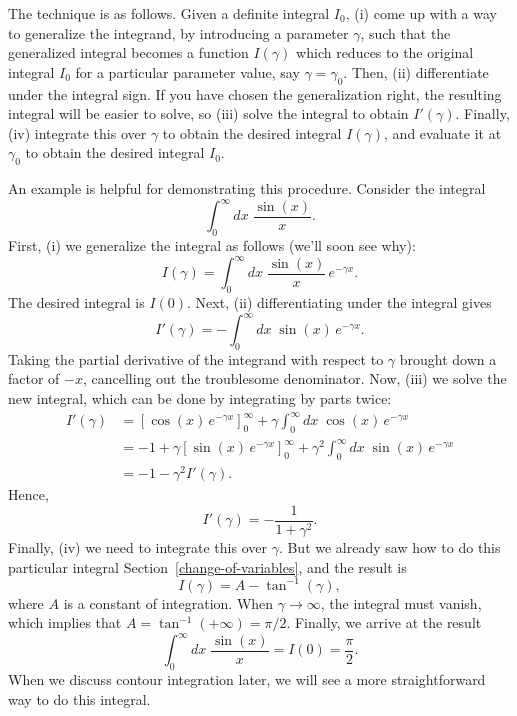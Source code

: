 \documentclass[10pt,a4paper]{article}
\begin{document}
The technique is as follows. Given a definite integral $I_0$, (i) come
up with a way to generalize the integrand, by introducing a parameter
$\gamma$, such that the generalized integral becomes a function
$I(\gamma)$ which reduces to the original integral $I_0$ for a
particular parameter value, say $\gamma = \gamma_0$. Then, (ii)
differentiate under the integral sign. If you have chosen the
generalization right, the resulting integral will be easier to solve, so
(iii) solve the integral to obtain $I'(\gamma)$. Finally, (iv)
integrate this over $\gamma$ to obtain the desired integral
$I(\gamma)$, and evaluate it at $\gamma_0$ to obtain the desired
integral $I_0$.

An example is helpful for demonstrating this procedure. Consider the
integral
\begin{equation}
\int_{0}^\infty dx \; \frac{\sin(x)}{x}.
\end{equation}
First, (i) we generalize the integral as follows (we'll soon see why):
\begin{equation}
I(\gamma) = \int_{0}^\infty dx \; \frac{\sin(x)}{x}\, e^{-\gamma x}.
\end{equation}
The desired integral is $I(0)$. Next, (ii) differentiating under the
integral gives
\begin{equation}
I'(\gamma) = - \int_{0}^\infty dx \; \sin(x)\, e^{-\gamma x}.
\end{equation}
Taking the partial derivative of the integrand with respect to
$\gamma$ brought down a factor of $-x$, cancelling out the
troublesome denominator. Now, (iii) we solve the new integral, which can
be done by integrating by parts twice:
\begin{equation}
\begin{aligned}I'(\gamma) &= \left[\cos(x)\,e^{-\gamma x}\right]_0^\infty + \gamma \int_{0}^\infty dx \; \cos(x)\, e^{-\gamma x} \\ &= -1 + \gamma \left[\sin(x)\,e^{-\gamma x}\right]_0^\infty + \gamma^2 \int_{0}^\infty dx \; \sin(x)\, e^{-\gamma x} \\&= -1 - \gamma^2 I'(\gamma).\end{aligned}
\end{equation}
Hence,
\begin{equation}
I'(\gamma) = - \frac{1}{1+\gamma^2}.
\end{equation}
Finally, (iv) we need to integrate this over $\gamma$. But we already
saw how to do this particular integral
Section~\ref{change-of-variables}, and the result is
\begin{equation}
I(\gamma) = A - \tan^{-1}(\gamma),
\end{equation}
where $A$ is a constant of integration. When
$\gamma \rightarrow \infty$, the integral must vanish, which implies
that $A = \tan^{-1}(+\infty) = \pi/2$. Finally, we arrive at the
result
\begin{equation}
\int_{0}^\infty dx \; \frac{\sin(x)}{x} = I(0) = \frac{\pi}{2}.
\end{equation}
When we discuss contour integration later, we will see a more
straightforward way to do this integral.
\end{document}
